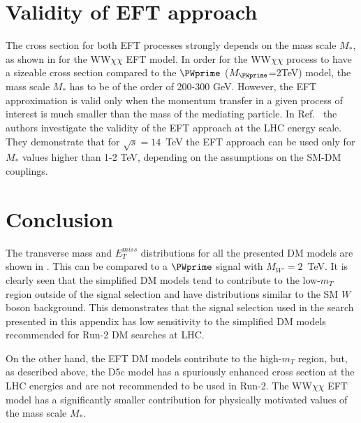 





\section{Validity of EFT approach}

The cross section for both EFT processes strongly depends on the mass scale $M_{*}$,
as shown in  for the WW$\chi\chi$ EFT model.
In order for the WW$\chi\chi$ process to have a sizeable cross section compared to the $\PWprime$ ($M_{\PWprime}$=2TeV) model, 
the mass scale $M_{*}$ has to be of the order of 200-300 GeV. 
However, the EFT approximation is valid only when the momentum transfer in a given
process of interest is much smaller than the mass of the mediating
particle. 
In Ref.~\cite{eft_validity_limits} the authors investigate the validity of the EFT approach at
the LHC energy scale. They demonstrate that for $\sqrt{s} = 14$~TeV the 
EFT approach can be used only for $M_{*}$ values higher than 1-2 TeV, depending on the assumptions on the SM-DM couplings.

\section{Conclusion}

The transverse mass and $E_{T}^{miss}$ distributions for all the presented DM models are shown in . This can be compared to a $\PWprime$ signal with $M_{W'} = 2$~TeV.
It is clearly seen that the simplified DM models tend to contribute to the low-$m_{T}$ region
outside of the signal selection and have distributions similar to the SM $W$ boson background.
This demonstrates that the signal selection used in the search presented in this appendix 
has low sensitivity to the simplified DM models recommended for Run-2 DM searches at LHC.

On the other hand, the EFT DM models contribute to the high-$m_{T}$ region, but, as described above, the D5c model has a spuriously enhanced cross section at the LHC energies and are not recommended to be used in Run-2. The WW$\chi\chi$ EFT model has a significantly smaller contribution for physically motivated values of the mass scale $M_{*}$.


